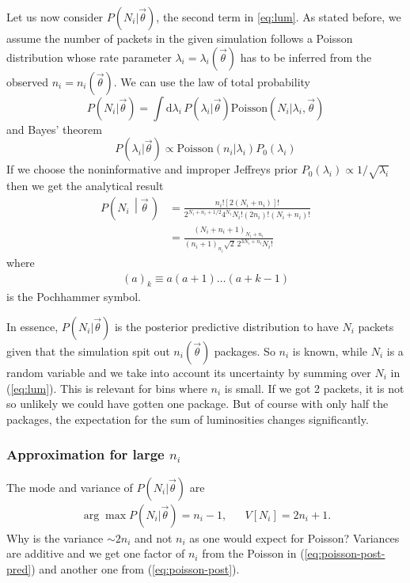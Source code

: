 \documentclass[a4,12pt]{article}
\newcommand{\given}[2]{\left(#1\, \middle| #2 \, \right)}
\newcommand{\poisson}{\ensuremath{\mathrm{Poisson}}}
\newcommand{\rmdx}[1]{\mbox{d} #1 \,} %
\newcommand{\vecth}{\ensuremath{{\vec{\theta}}}}
\def \refeq#1{(\ref{eq:#1})}
\begin{document}
Let us now consider $P(N_i | \vecth)$, the second term in
\eqref{eq:lum}. As stated before, we assume the number of packets in
the given simulation follows a Poisson distribution whose rate
parameter $\lambda_i = \lambda_i(\vecth)$ has to be inferred from the
observed $n_i = n_i(\vecth)$. We can use the law of total probability
\begin{equation}
  \label{eq:poisson-post-pred}
  P(N_i | \vecth) = \int \rmdx{\lambda_i} P(\lambda_i | \vecth) \poisson(N_i | \lambda_i, \vecth)
\end{equation}
and Bayes' theorem
\begin{equation}
  \label{eq:poisson-post}
  P(\lambda_i | \vecth) \propto \poisson(n_i | \lambda_i) P_0(\lambda_i)
\end{equation}
If we choose the noninformative and improper Jeffreys prior
$P_0(\lambda_i) \propto 1/\sqrt{\lambda_i}$ then we get the analytical
result~\cite[Eq. 5]{Aggarwal:2011aa}
\begin{align}
  \label{eq:post-pred-analytical}
  P\given{N_i}{\vecth} &= \frac{n_i! [2 (N_i + n_i)]!}{2^{N_i+n_i+1/2}4^{N_i} N_i! (2 n_i)! (N_i + n_i)!}\\
  &= \frac{(N_i + n_i + 1)_{N_i + n_i}}{(n_i + 1)_{n_i} \sqrt{2}\, 2^{3N_i + n_i}N_i!}
\end{align}
where
\begin{align}
  \label{eq:pochhammer}
  (a)_k \equiv a (a + 1) \dots (a + k - 1)
\end{align}
is the Pochhammer symbol.

In essence, $P(N_i | \vecth)$ is
the posterior predictive distribution to have $N_i$ packets given that
the simulation spit out $n_i(\vecth)$ packages. So $n_i$ is known,
while $N_i$ is a random variable and we take into account its
uncertainty by summing over $N_i$ in \refeq{lum}. This is relevant for bins where $n_i$ is small. If we got
2 packets, it is not so unlikely we could have gotten one package. But
of course with only half the packages, the expectation for the sum of
luminosities changes significantly.

\subsubsection*{Approximation for large $n_i$}

The mode and variance of $P(N_i | \vecth)$ are
\begin{align}
  \label{eq:poisson-mode-variance}
  \arg \max P(N_i | \vecth) = n_i -1, && V[N_i] = 2 n_i + 1.
\end{align}
Why is the variance $\sim 2 n_i$ and not $n_i$ as one would expect for Poisson? Variances are additive and we get one factor of $n_i$ from the Poisson in \refeq{poisson-post-pred} and another one from \refeq{poisson-post}.
\end{document}
